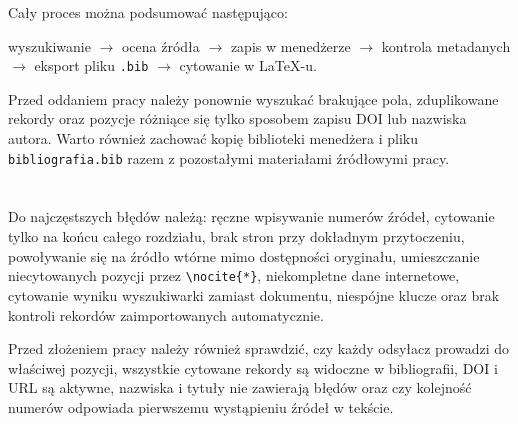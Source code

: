 Cały proces można podsumować następująco:
\begin{center}
  \small
  wyszukiwanie $\rightarrow$ ocena źródła $\rightarrow$ zapis w menedżerze
  $\rightarrow$ kontrola metadanych $\rightarrow$ eksport pliku \texttt{.bib}
  $\rightarrow$ cytowanie w LaTeX-u.
\end{center}

Przed oddaniem pracy należy ponownie wyszukać brakujące pola, zduplikowane rekordy oraz pozycje różniące się tylko sposobem zapisu DOI lub nazwiska autora. Warto również zachować kopię biblioteki menedżera i pliku \texttt{bibliografia.bib} razem z pozostałymi materiałami źródłowymi pracy.

\section{}

Do najczęstszych błędów należą: ręczne wpisywanie numerów źródeł, cytowanie tylko na końcu całego rozdziału, brak stron przy dokładnym przytoczeniu, powoływanie się na źródło wtórne mimo dostępności oryginału, umieszczanie niecytowanych pozycji przez \verb|\nocite{*}|, niekompletne dane internetowe, cytowanie wyniku wyszukiwarki zamiast dokumentu, niespójne klucze oraz brak kontroli rekordów zaimportowanych automatycznie.

Przed złożeniem pracy należy również sprawdzić, czy każdy odsyłacz prowadzi do właściwej pozycji, wszystkie cytowane rekordy są widoczne w bibliografii, DOI i URL są aktywne, nazwiska i tytuły nie zawierają błędów oraz czy kolejność numerów odpowiada pierwszemu wystąpieniu źródeł w tekście.
